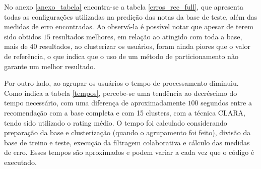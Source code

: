 \documentclass[12pt,a4paper,header]{abnt}
\begin{document}
No anexo \ref{anexo_tabela} encontra-se a tabela \ref{erros_rec_full}, que apresenta todas as configurações utilizadas na predição das notas da base de teste, além das medidas de erro encontradas. Ao observá-la é possível notar que apesar de terem sido obtidos $15$ resultados melhores, em relação ao atingido com toda a base, mais de $40$ resultados, ao clusterizar os usuários, foram ainda piores que o valor de referência, o que indica que o uso de um método de particionamento não garante um melhor resultado.

Por outro lado, ao agrupar os usuários o tempo de processamento diminuiu. Como indica a tabela \ref{tempos}, percebe-se uma tendência ao decréscimo do tempo necessário, com uma diferença de aproximadamente $100$ segundos entre a recomendação com a base completa e com 15 clusters, com a técnica CLARA, tendo sido utilizado o rating médio. O tempo foi calculado considerando preparação da base e clusterização (quando o agrupamento foi feito), divisão da base de treino e teste, execução da filtragem colaborativa e cálculo das medidas de erro. Esses tempos são aproximados e podem variar a cada vez que o código é executado.
\end{document}
